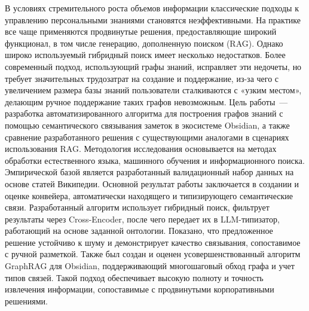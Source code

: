 В условиях стремительного роста объемов информации классические подходы к управлению персональными знаниями становятся неэффективными. На практике все чаще применяются продвинутые решения, предоставляющие широкий функционал, в том числе генерацию, дополненную поиском (RAG). Однако широко используемый гибридный поиск имеет несколько недостатков. Более современный подход, использующий графы знаний, исправляет эти недочеты, но требует значительных трудозатрат на создание и поддержание, из-за чего с увеличением размера базы знаний пользователи сталкиваются с «узким местом», делающим ручное поддержание таких графов невозможным. Цель работы~--- разработка автоматизированного алгоритма для построения графов знаний с помощью семантического связывания заметок в экосистеме Obsidian, а также сравнение разработанного решения с существующими аналогами в сценариях использования RAG. Методология исследования основывается на методах обработки естественного языка, машинного обучения и информационного поиска. Эмпирической базой является разработанный валидационный набор данных на основе статей Википедии. Основной результат работы заключается в создании и оценке конвейера, автоматически находящего и типизирующего семантические связи. Разработанный алгоритм использует гибридный поиск, фильтрует результаты через Cross-Encoder, после чего передает их в LLM-типизатор, работающий на основе заданной онтологии. Показано, что предложенное решение устойчиво к шуму и демонстрирует качество связывания, сопоставимое с ручной разметкой. Также был создан и оценен усовершенствованный алгоритм GraphRAG для Obsidian, поддерживающий многошаговый обход графа и учет типов связей. Такой подход обеспечивает высокую полноту и точность извлечения информации, сопоставимые с продвинутыми корпоративными решениями.   
  
